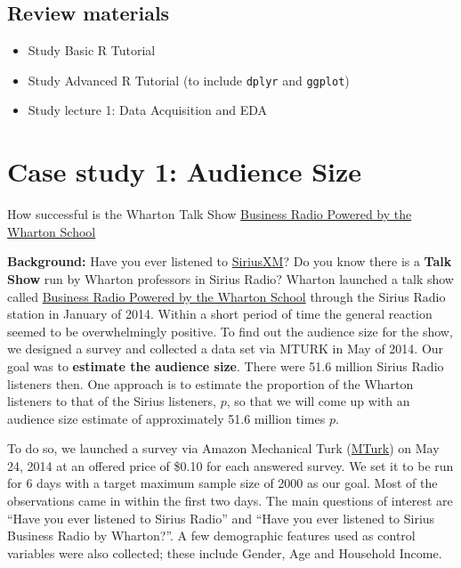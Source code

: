 \documentclass[
]{article}
\providecommand{\tightlist}{%
  \setlength{\itemsep}{0pt}\setlength{\parskip}{0pt}}
\begin{document}
\hypertarget{review-materials}{%
\subsection{Review materials}\label{review-materials}}

\begin{itemize}
\tightlist
\item
  Study Basic R Tutorial
\item
  Study Advanced R Tutorial (to include \texttt{dplyr} and
  \texttt{ggplot})
\item
  Study lecture 1: Data Acquisition and EDA
\end{itemize}

\hypertarget{case-study-1-audience-size}{%
\section{Case study 1: Audience Size}\label{case-study-1-audience-size}}

How successful is the Wharton Talk Show
\href{https://businessradio.wharton.upenn.edu/}{Business Radio Powered
by the Wharton School}

\textbf{Background:} Have you ever listened to
\href{https://www.siriusxm.com/}{SiriusXM}? Do you know there is a
\textbf{Talk Show} run by Wharton professors in Sirius Radio? Wharton
launched a talk show called
\href{https://businessradio.wharton.upenn.edu/}{Business Radio Powered
by the Wharton School} through the Sirius Radio station in January of
2014. Within a short period of time the general reaction seemed to be
overwhelmingly positive. To find out the audience size for the show, we
designed a survey and collected a data set via MTURK in May of 2014. Our
goal was to \textbf{estimate the audience size}. There were 51.6 million
Sirius Radio listeners then. One approach is to estimate the proportion
of the Wharton listeners to that of the Sirius listeners, \(p\), so that
we will come up with an audience size estimate of approximately 51.6
million times \(p\).

To do so, we launched a survey via Amazon Mechanical Turk
(\href{https://www.mturk.com/}{MTurk}) on May 24, 2014 at an offered
price of \$0.10 for each answered survey. We set it to be run for 6 days
with a target maximum sample size of 2000 as our goal. Most of the
observations came in within the first two days. The main questions of
interest are ``Have you ever listened to Sirius Radio'' and ``Have you
ever listened to Sirius Business Radio by Wharton?''. A few demographic
features used as control variables were also collected; these include
Gender, Age and Household Income.
\end{document}
